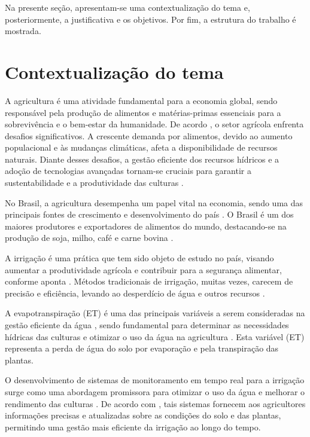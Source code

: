 Na presente seção, apresentam-se uma contextualização do tema e, posteriormente, a justificativa e os objetivos. Por fim, a estrutura do trabalho é mostrada.

\section{Contextualização do tema}
A agricultura é uma atividade fundamental para a economia global, sendo responsável pela produção de alimentos e matérias-primas essenciais para a sobrevivência e o bem-estar da humanidade. De acordo \textcite{carmody_fao2023}, o setor agrícola enfrenta desafios significativos. A crescente demanda por alimentos, devido ao aumento populacional e às mudanças climáticas, afeta a disponibilidade de recursos naturais. Diante desses desafios, a gestão eficiente dos recursos hídricos e a adoção de tecnologias avançadas tornam-se cruciais para garantir a sustentabilidade e a produtividade das culturas \parencite{carmody_fao2023}.

No Brasil, a agricultura desempenha um papel vital na economia, sendo uma das principais fontes de crescimento e desenvolvimento do país \parencite{Ramos_irrigacao2022}. O Brasil é um dos maiores produtores e exportadores de alimentos do mundo, destacando-se na produção de soja, milho, café e carne bovina \parencite{Ramos_irrigacao2022}. 

A irrigação é uma prática que tem sido objeto de estudo no país, visando aumentar a produtividade agrícola e contribuir para a segurança alimentar, conforme aponta \textcite{Ramos_irrigacao2022}. Métodos tradicionais de irrigação, muitas vezes, carecem de precisão e eficiência, levando ao desperdício de água e outros recursos \parencite{Pereira_irrigation2002}.

A evapotranspiração (ET) é uma das principais variáveis a serem consideradas na gestão eficiente da água \parencite{yang_nature2023}, sendo fundamental para determinar as necessidades hídricas das culturas e otimizar o uso da água na agricultura \parencite{carmody_fao2023, yang_nature2023}. Esta variável (ET) representa a perda de água do solo por evaporação e pela transpiração das plantas. 

O desenvolvimento de sistemas de monitoramento em tempo real para a irrigação surge como uma abordagem promissora para otimizar o uso da água e melhorar o rendimento das culturas \parencite{Vijh_system2024, Dutta_system2024, Amine_system2024}. De acordo com \textcite{Prathibha_system2017}, tais sistemas fornecem aos agricultores informações precisas e atualizadas sobre as condições do solo e das plantas, permitindo uma gestão mais eficiente da irrigação ao longo do tempo.


